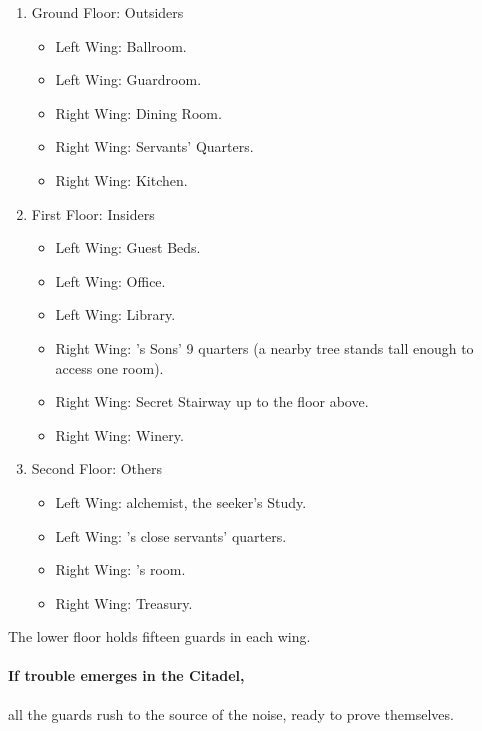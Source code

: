 \begin{multicols}{2}
\begin{enumerate}
  \item{Ground Floor: Outsiders}
    \begin{itemize}
      \item{Left Wing: Ballroom.}
      \item
      Left Wing: Guardroom.
      \item
      Right Wing: Dining Room.
      \item
      Right Wing: Servants' Quarters.
      \item
      Right Wing: Kitchen.
    \end{itemize}
  \item{First Floor: Insiders}
    \begin{itemize}
      \item
      Left Wing: Guest Beds.
      \item
      Left Wing: Office.
      \item
      Left Wing: Library.
      \item
      Right Wing: 's Sons' 9 quarters (a nearby tree stands tall enough to access one room).
      \item
      Right Wing: Secret Stairway up to the floor above.
      \item
      Right Wing: Winery.
    \end{itemize}
  \item
  Second Floor: Others
    \begin{itemize}
      \item
      Left Wing: \gls{alchemist}, the \gls{seeker}'s Study.
      \item
      Left Wing: 's close servants' quarters.
      \item
      Right Wing: 's room.
      \item
      Right Wing: Treasury.
    \end{itemize}
\end{enumerate}

The lower floor holds fifteen guards in each wing.


\paragraph{If trouble emerges in the Citadel,}
all the guards rush to the source of the noise, ready to prove themselves.


\end{multicols}

